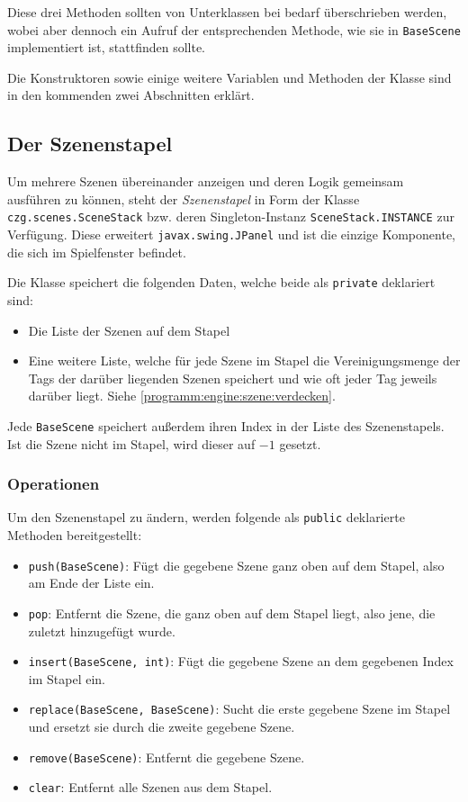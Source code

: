 \begin{sloppypar}
Diese drei Methoden sollten von Unterklassen bei bedarf überschrieben
werden, wobei aber dennoch ein Aufruf der entsprechenden Methode,
wie sie in \texttt{BaseScene} implementiert ist, stattfinden sollte.

Die Konstruktoren sowie einige weitere Variablen und Methoden
der Klasse sind in den kommenden zwei Abschnitten erklärt.


\subsection{Der Szenenstapel} \label{programm:engine:szene:stapel}

Um mehrere Szenen übereinander anzeigen und deren Logik gemeinsam
ausführen zu können, steht der \textit{Szenenstapel} in Form der
Klasse \texttt{czg.scenes.SceneStack} bzw. deren Singleton-Instanz
\texttt{SceneStack.INSTANCE} zur Verfügung. Diese erweitert
\texttt{javax.swing.JPanel} und ist die einzige Komponente, die sich
im Spielfenster befindet.

Die Klasse speichert die folgenden Daten, welche beide als \texttt{private}
deklariert sind:

\begin{itemize}
	\item Die Liste der Szenen auf dem Stapel
	\item Eine weitere Liste, welche für jede Szene im Stapel
	      die Vereinigungsmenge der Tags der darüber liegenden
	      Szenen speichert und wie oft jeder Tag jeweils darüber
	      liegt. Siehe \ref{programm:engine:szene:verdecken}.
\end{itemize}

Jede \texttt{BaseScene} speichert außerdem ihren Index in der
Liste des Szenenstapels. Ist die Szene nicht im Stapel, wird
dieser auf $-1$ gesetzt.


\subsubsection{Operationen}

Um den Szenenstapel zu ändern, werden folgende als
\texttt{public} deklarierte Methoden bereitgestellt:

\begin{itemize}
	\item \texttt{push(BaseScene)}: Fügt die gegebene Szene ganz oben auf
	      dem Stapel, also am Ende der Liste ein.
	\item \texttt{pop}: Entfernt die Szene, die ganz oben auf dem Stapel
	      liegt, also jene, die zuletzt hinzugefügt wurde.
	\item \texttt{insert(BaseScene, int)}: Fügt die gegebene Szene an dem
	      gegebenen Index im Stapel ein.
	\item \texttt{replace(BaseScene, BaseScene)}: Sucht die erste gegebene
	      Szene im Stapel und ersetzt sie durch die zweite gegebene Szene.
	\item \texttt{remove(BaseScene)}: Entfernt die gegebene Szene.
	\item \texttt{clear}: Entfernt alle Szenen aus dem Stapel.
\end{itemize}


\end{sloppypar}
